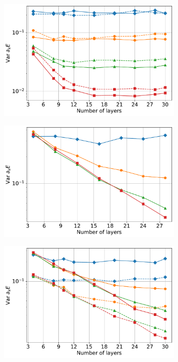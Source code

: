 \begin{figure}
    \centering
    \begin{subfigure}{.48\linewidth}
        \centering
        \includegraphics[width=\textwidth]{../figures/plateau_hubbard_jw_both.pdf}
    \end{subfigure}\begin{subfigure}{.48\linewidth}
        \centering
        \includegraphics[width=\textwidth]{../figures/plateau_hubbard_bk.pdf}
    \end{subfigure}
    \begin{subfigure}{.48\linewidth}
        \centering
        \includegraphics[width=\textwidth]{../figures/plateau_ising_both.pdf}

\end{subfigure}
\end{figure}
